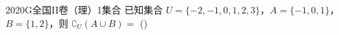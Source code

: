 
\begin{problem}{2020}{G}{全国II卷（理）}{1}{集合}
已知集合 $ U = \{-2,-1,0,1,2,3\} $，$ A = \{-1,0,1\} $，$ B = \{1,2\} $，则 $ \complement_U (A \cup B) = $ (\hspace{1cm})
\begin{choices}
\end{choices}
\end{problem}

\begin{answer}

\end{answer}

\begin{solutions}

\end{solutions}